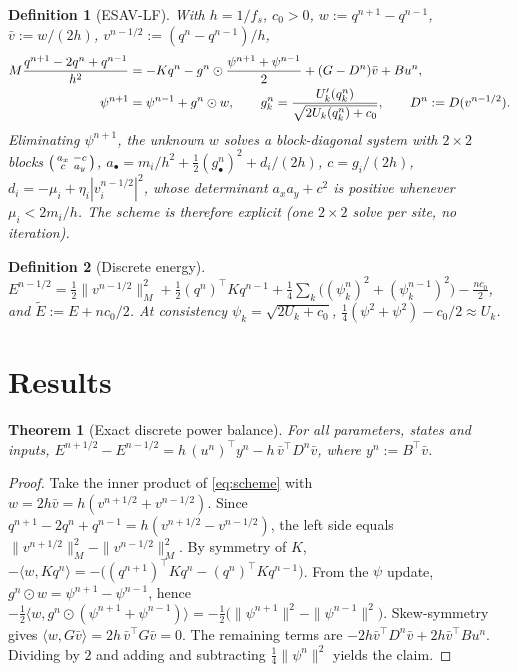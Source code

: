 \documentclass[11pt]{article}
\newtheorem{theorem}{Theorem}
\newtheorem{definition}{Definition}
\theoremstyle{remark}\newtheorem{remark}{Remark}
\newcommand{\ip}[2]{\langle #1,#2\rangle}
\begin{document}
\begin{definition}[ESAV-LF]
With $h=1/f_s$, $c_0>0$, $w:=q^{n+1}-q^{n-1}$, $\bar v:=w/(2h)$, $v^{n-1/2}:=(q^n-q^{n-1})/h$,
\begin{align}
M\frac{q^{n+1}-2q^n+q^{n-1}}{h^2}&=-Kq^n-g^n\odot\frac{\psi^{n+1}+\psi^{n-1}}{2}+(G-D^n)\bar v+Bu^n,\label{eq:scheme}\\
\psi^{n+1}&=\psi^{n-1}+g^n\odot w,\qquad g^n_k=\frac{U_k'(q^n_k)}{\sqrt{2U_k(q^n_k)+c_0}},\qquad D^n:=D(v^{n-1/2}).\notag
\end{align}
Eliminating $\psi^{n+1}$, the unknown $w$ solves a block-diagonal system with $2\times2$ blocks
$\begin{psmallmatrix}a_x&-c\\c&a_y\end{psmallmatrix}$, $a_\bullet=m_i/h^2+\tfrac12(g^n_\bullet)^2+d_i/(2h)$, $c=g_i/(2h)$,
$d_i=-\mu_i+\eta_i|v_i^{n-1/2}|^2$, whose determinant $a_xa_y+c^2$ is positive whenever $\mu_i<2m_i/h$. The scheme is
therefore explicit (one $2\times2$ solve per site, no iteration).
\end{definition}

\begin{definition}[Discrete energy]
$E^{n-1/2}=\tfrac12\|v^{n-1/2}\|_M^2+\tfrac12(q^n)^\top Kq^{n-1}+\tfrac14\sum_k\big((\psi^n_k)^2+(\psi^{n-1}_k)^2\big)-\tfrac{nc_0}{2}$,
and $\tilde E:=E+nc_0/2$. At consistency $\psi_k=\sqrt{2U_k+c_0}$, $\tfrac14(\psi^2+\psi^2)-c_0/2\approx U_k$.
\end{definition}

\section{Results}
\begin{theorem}[Exact discrete power balance]\label{thm:balance}
For all parameters, states and inputs,
$E^{n+1/2}-E^{n-1/2}=h\,(u^n)^\top y^n-h\,\bar v^\top D^n\bar v$, where $y^n:=B^\top\bar v$.
\end{theorem}
\begin{proof}
Take the inner product of \eqref{eq:scheme} with $w=2h\bar v=h(v^{n+1/2}+v^{n-1/2})$. Since
$q^{n+1}-2q^n+q^{n-1}=h(v^{n+1/2}-v^{n-1/2})$, the left side equals $\|v^{n+1/2}\|_M^2-\|v^{n-1/2}\|_M^2$.
By symmetry of $K$, $-\ip{w}{Kq^n}=-\big((q^{n+1})^\top Kq^n-(q^n)^\top Kq^{n-1}\big)$. From the $\psi$ update,
$g^n\odot w=\psi^{n+1}-\psi^{n-1}$, hence $-\tfrac12\ip{w}{g^n\odot(\psi^{n+1}+\psi^{n-1})}=-\tfrac12\big(\|\psi^{n+1}\|^2-\|\psi^{n-1}\|^2\big)$.
Skew-symmetry gives $\ip{w}{G\bar v}=2h\,\bar v^\top G\bar v=0$. The remaining terms are $-2h\bar v^\top D^n\bar v+2h\bar v^\top Bu^n$.
Dividing by $2$ and adding and subtracting $\tfrac14\|\psi^n\|^2$ yields the claim.
\end{proof}
\end{document}
